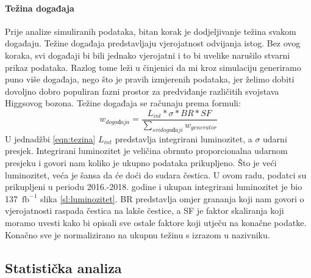 \documentclass[12pt,a4paper,oneside]{article}
\begin{document}
\begin{linenumbers}
		\paragraph{Težina događaja\newline}
		Prije analize simuliranih podataka, bitan korak je dodjeljivanje težina svakom događaju. Težine događaja predstavljaju vjerojatnost odvijanja istog. Bez ovog koraka, svi događaji bi bili jednako vjerojatni i to bi uvelike narušilo stvarni prikaz podataka. Razlog tome leži u činjenici da mi kroz simulaciju generiramo puno više događaja, nego što je pravih izmjerenih podataka, jer želimo dobiti dovoljno dobro populiran fazni prostor za predviđanje različitih svojstava Higgsovog bozona.
		Težine događaja se računaju prema formuli:	
		\begin{equation}\label{eqn:tezina}
		w_{događaja} =  \frac{L_{int}*\sigma*BR*{SF}}{\sum_{svi događaji} w_{generator}}
		\end{equation}
		U jednadžbi \ref{eqn:tezina} ${L_{int}}$ predstavlja integrirani luminozitet, a $\sigma$ udarni presjek. Integrirani luminozitet je veličina obrnuto proporcionalna udarnom presjeku i govori nam koliko je ukupno podataka prikupljeno. Što je veći luminozitet, veća je šansa da će doći do sudara čestica. U ovom radu, podatci su prikupljeni u periodu 2016.-2018. godine i ukupan integrirani luminozitet je bio 137~$\mathrm{fb}^{-1}$ slika \ref{sl:luminozitet}.  BR predstavlja omjer grananja koji nam govori o vjerojatnosti raspada čestica na lakše čestice, a SF je faktor skaliranja koji moramo uvesti kako bi opisali sve ostale faktore koji utječu na konačne podatke. Konačno sve je normalizirano na ukupnu težinu s izrazom u nazivniku. 
		
		\subsection{Statistička analiza}

\end{linenumbers}
\end{document}
